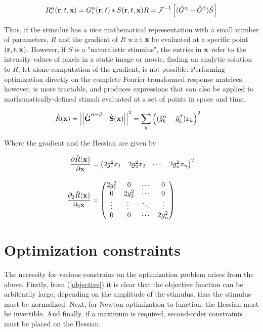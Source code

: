 \documentclass{article}
\newcommand{\vect}[1]{\textbf{\textrm{#1}}}
\newcommand{\pd}[2]{\frac{\partial {#1}}{\partial {#2}}}
\newcommand{\pdd}[2]{\frac{\partial_2 {#1}}{\partial_2 {#2}}}
\begin{document}
\begin{equation*}
	R_{r}^{\alpha}(\vect{r},t,\vect{x}) = G_{r}^{\alpha}(\vect{r},t)*S(\vect{r},t,\vect{x}) 
	\\[1em]
	R = \mathcal{F}^{-1} \left[ (\hat{G}^{\alpha} - \hat{G}^{\beta})\hat{S}\right]
\end{equation*}

Thus, if the stimulus has a nice mathematical representation with a small number of parameters, $R$ and the gradient of $R$ w.r.t \vect{x} be evaluated at a specific point $(\vect{r},t,\vect{x})$.
However, if $S$ is a "naturalistic stimulus", the entries in $\vect{x}$ refer to the intensity values of pixels in a static image or movie, finding an analytic solution to $R$, let alone computation of the gradient, is not possible.
Performing optimization directly on the complete Fourier-transformed response matrices, however, is more tractable, and produces expressions that can also be applied to mathematically-defined stimuli evaluated at a set of points in space and time.

\begin{align} \label{objective}
	\hat{R}(\vect{x}) & = \left|\left| \hat{\vect{G}}^{\alpha - \beta} \circ 
						   \hat{\vect{S}}(\vect{x}) \right|\right|^2 = 
						   \sum_{k}{\left( (\hat{g}_k^{\alpha} - \hat{g}_k^{\beta}) x_k \right)^2}
\end{align}

Where the gradient and the Hessian are given by

\begin{align}
	\pd{\hat{R}(\vect{x})}{\vect{x}} & = 
	\begin{pmatrix}
		2 g_1^2 x_1 & 2 g_2^2 x_2 & \cdots & 2 g_n^2 x_n
	\end{pmatrix}^{T} \label{objgradient} \\[1em]
	\pdd{\hat{R}(\vect{x})}{\vect{x}} & =
	\begin{pmatrix}
		2 g_1^2 & 0 & \cdots & 0 \\
		0 & 2 g_2^2 & \cdots & 0 \\
		\vdots & \vdots\ & \ddots & \vdots \\
		0 & 0 & \cdots & 2g_n^2
	\end{pmatrix} \label{objhessian}
\end{align}


\section{Optimization constraints} \label{constraints}
The necessity for various constrains on the optimization problem arises from the above. Firstly, from (\ref{objective}) it is clear that the objective function can be arbitrarily large, depending on the amplitude of the stimulus, thus the stimulus must be normalized. Next, for Newton optimization to function, the Hessian must be invertible. And finally, if a maximum is required, second-order constraints must be placed on the Hessian.
\end{document}
